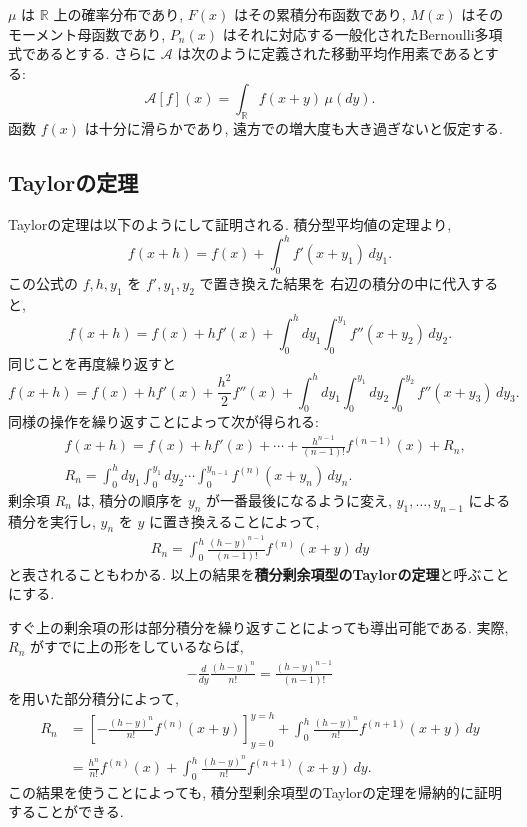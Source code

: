 \documentclass[12pt,twoside]{jarticle}
\newcommand\BF{\bfseries}
\newcommand\R{{\mathbb R}} %
\newcommand\A{{\mathscr A}}
\theoremstyle{jplain}
\theoremstyle{jplain}
\theoremstyle{jplain}
\numberwithin{theorem}{section}
\numberwithin{equation}{section}
\numberwithin{figure}{section}
\numberwithin{table}{section}
\begin{document}
$\mu$ は $\R$ 上の確率分布であり, $F(x)$ はその累積分布函数であり,
$M(x)$ はそのモーメント母函数であり,
$P_n(x)$ はそれに対応する一般化されたBernoulli多項式であるとする.
さらに $\A$ は次のように定義された移動平均作用素であるとする:
\[
\A[f](x) = \int_\R f(x+y)\,\mu(dy).
\]
函数 $f(x)$ は十分に滑らかであり, 遠方での増大度も大き過ぎないと仮定する.


\subsection{Taylorの定理}
\label{sec:Taylor}

Taylorの定理は以下のようにして証明される. 積分型平均値の定理より,
\[
f(x+h) = f(x) + \int_0^h f'(x+y_1)\,dy_1.
\]
この公式の $f,h,y_1$ を $f',y_1,y_2$ で置き換えた結果を
右辺の積分の中に代入すると,
\[
f(x+h) = f(x) + h f'(x) + \int_0^h dy_1\int_0^{y_1} f''(x+y_2)\,dy_2.
\]
同じことを再度繰り返すと
\[
f(x+h)
= f(x) + h f'(x) + \frac{h^2}2 f''(x)
+ \int_0^h dy_1\int_0^{y_1}dy_2\int_0^{y_2} f''(x+y_3)\,dy_3.
\]
同様の操作を繰り返すことによって次が得られる:
\begin{align*}
  &
  f(x+h)=f(x)+hf'(x)+\cdots+\frac{h^{n-1}}{(n-1)!}f^{(n-1)}(x)+R_n,
  \\ &
  R_n =
  \int_0^h dy_1\int_0^{y_1}dy_2
  \cdots\int_0^{y_{n-1}}f^{(n)}(x+y_n)\,dy_n.
\end{align*}
剰余項 $R_n$ は, 積分の順序を $y_n$ が一番最後になるように変え,
$y_1,\ldots,y_{n-1}$ による積分を実行し,
$y_n$ を $y$ に置き換えることによって,
\begin{align*}
  R_n = \int_0^h \frac{(h-y)^{n-1}}{(n-1)!}f^{(n)}(x+y)\,dy
\end{align*}
と表されることもわかる.
以上の結果を{\BF 積分剰余項型のTaylorの定理}と呼ぶことにする.

すぐ上の剰余項の形は部分積分を繰り返すことによっても導出可能である.
実際, $R_n$ がすでに上の形をしているならば,
\begin{align*}
  -\frac{d}{dy}\frac{(h-y)^n}{n!} = \frac{(h-y)^{n-1}}{(n-1)!}
\end{align*}
を用いた部分積分によって,
\begin{align*}
  R_n
  &= \left[-\frac{(h-y)^n}{n!}f^{(n)}(x+y)\right]_{y=0}^{y=h}
  + \int_0^h \frac{(h-y)^n}{n!} f^{(n+1)}(x+y)\,dy
  \\
  & = \frac{h^n}{n!}f^{(n)}(x)
  + \int_0^h \frac{(h-y)^n}{n!} f^{(n+1)}(x+y)\,dy.
\end{align*}
この結果を使うことによっても,
積分型剰余項型のTaylorの定理を帰納的に証明することができる.
\end{document}
